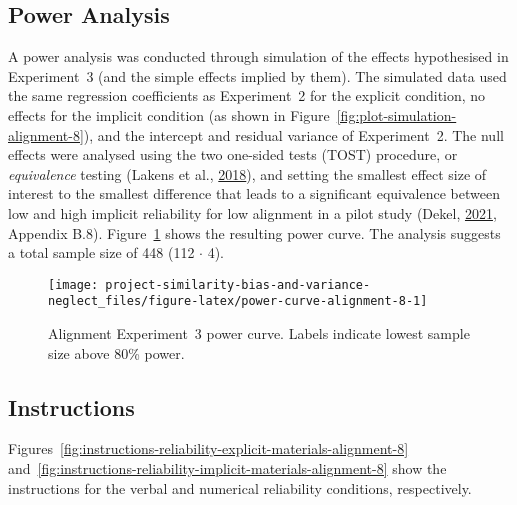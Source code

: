 \documentclass[
  english,
  man, donotrepeattitle,floatsintext]{apa7}
\theoremstyle{definition}
\theoremstyle{definition}
\theoremstyle{definition}
\theoremstyle{definition}
\theoremstyle{remark}
\begin{document}
\hypertarget{power-analysis-alignment-8}{%
\subsection{Power Analysis}\label{power-analysis-alignment-8}}

A power analysis was conducted through simulation of the effects hypothesised in
Experiment~3 (and the simple effects implied by them). The simulated data used
the same regression coefficients as Experiment~2 for the explicit condition, no
effects for the implicit condition (as shown in
Figure~\ref{fig:plot-simulation-alignment-8}), and the intercept and residual
variance of Experiment~2. The null effects were analysed using the two one-sided
tests (TOST) procedure, or \emph{equivalence} testing (Lakens et al., \protect\hyperlink{ref-lakens2018}{2018}), and setting the
smallest effect size of interest to the smallest difference that leads to a
significant equivalence between low and high implicit reliability for low
alignment in a pilot study (Dekel, \protect\hyperlink{ref-dekel2021b}{2021}, Appendix B.8).
Figure~\ref{fig:power-curve-alignment-8} shows the resulting power curve. The
analysis suggests a total sample size of 448
(112 \(\cdot\) 4).

\newpage

\begin{landscape}



\begin{figure}
\texttt{[image: project-similarity-bias-and-variance-neglect\_files/figure-latex/power-curve-alignment-8-1]} \caption{Alignment Experiment~3 power curve. Labels indicate lowest sample size above 80\% power.}\label{fig:power-curve-alignment-8}
\end{figure}

\end{landscape}

\newpage

\hypertarget{instructions-materials-alignment-8-appendix}{%
\subsection{Instructions}\label{instructions-materials-alignment-8-appendix}}

Figures~\ref{fig:instructions-reliability-explicit-materials-alignment-8}
and~\ref{fig:instructions-reliability-implicit-materials-alignment-8} show the
instructions for the verbal and numerical reliability conditions, respectively.
\end{document}
